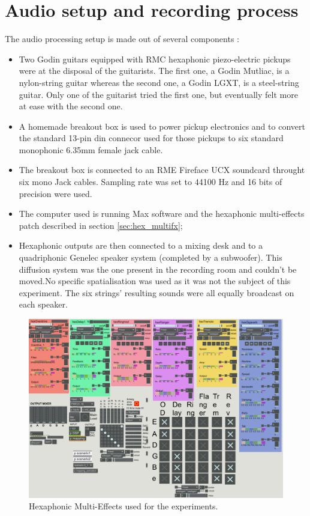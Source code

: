 \documentclass{article}
\begin{document}
\section{Audio setup and recording process}\label{sec:setup}
The audio processing setup is made out of several components : 
\begin{itemize}
    \item Two Godin guitars equipped with RMC hexaphonic piezo-electric pickups were at the disposal of the guitarists. 
    The first one, a Godin Mutliac, is a nylon-string guitar whereas the second one, a Godin LGXT, is a steel-string 
    guitar. Only one of the guitarist tried the first one, but eventually felt more at ease with the second one.
    \item A homemade breakout box is used to power pickup electronics and to convert the standard 13-pin din connecor 
    used for those pickups to six standard monophonic 6.35mm female jack cable. 
    \item The breakout box is connected to an RME Fireface UCX soundcard throught six mono Jack cables. Sampling rate was 
    set to 44100 Hz and 16 bits of precision were used. 
	\item The computer used is running Max software and the hexaphonic multi-effects patch described in section \ref{sec:hex_multifx};
    \item Hexaphonic outputs are then connected to a mixing desk and to a quadriphonic Genelec speaker system (completed by a
    subwoofer). This diffusion system was the one present in the recording room and couldn't be moved.No specific
    spatialisation was used as it was not the subject of this experiment. The six strings' resulting sounds were all equally broadcast on each speaker.
    
\end{itemize}

\begin{figure}
    \centering
    \includegraphics[scale=0.3]{figures/191025-Patch-experience.png}
    \caption{Hexaphonic Multi-Effects used for the experiments.}
    \label{fig:hex-multi-effects}
\end{figure}
\end{document}
